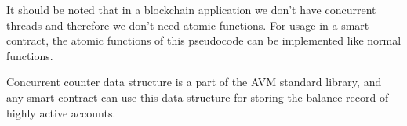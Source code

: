 It should be noted that in a blockchain application we don't have concurrent threads and therefore we don't need
atomic functions. For usage in a smart contract, the atomic functions of this pseudocode can be implemented like
normal functions.

Concurrent counter data structure is a part of the AVM standard library, and any smart contract can use this data
structure for storing the balance record of highly active accounts.

